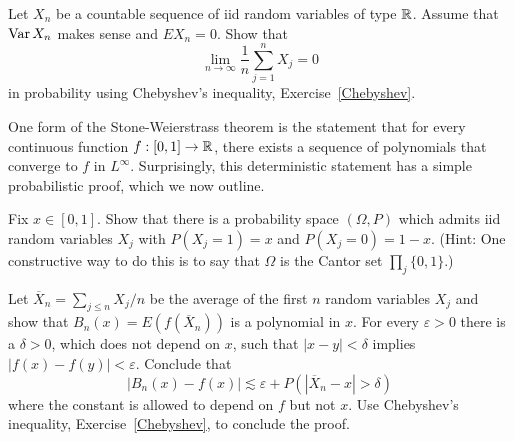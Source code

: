 \begin{exercise}
Let $X_{n}$ be a countable sequence of iid random variables of type $\mathbb{R}$.
Assume that $\operatorname{Var} X_{n}$ makes sense and $EX_{n} = 0$. Show that
\[\lim_{n \to \infty} \frac{1}{n} \sum_{j=1}^{n} X_{j} = 0\]
in probability using Chebyshev's inequality, Exercise~\ref{Chebyshev}.
\end{exercise}

\begin{exercise}
One form of the Stone-Weierstrass theorem is the statement that for every continuous function $f: [0, 1] \to \mathbb{R}$, there exists a sequence of polynomials that converge to $f$ in $L^\infty$.
Surprisingly, this deterministic statement has a simple probabilistic proof, which we now outline.

Fix $x \in [0, 1]$.
Show that there is a probability space $(\Omega, P)$ which admits iid random variables $X_{j}$ with $P(X_{j} = 1) = x$ and $P(X_{j} = 0) = 1 - x$.
(Hint: One constructive way to do this is to say that $\Omega$ is the Cantor set $\prod_{j} \{0, 1\}$.)

Let $\overline X_{n} = \sum_{j \leq n} X_{j}/n$ be the average of the first $n$ random variables $X_{j}$ and show that $B_{n}(x) = E(f(\overline X_{n}))$ is a polynomial in $x$.
For every $\varepsilon > 0$ there is a $\delta > 0$, which does not depend on $x$, such that $|x - y| < \delta$ implies $|f(x) - f(y)| < \varepsilon$.
Conclude that
\[|B_{n}(x) - f(x)| \lesssim \varepsilon + P(|\overline X_{n} - x| > \delta)\]
where the constant is allowed to depend on $f$ but not $x$.
Use Chebyshev's inequality, Exercise~\ref{Chebyshev}, to conclude the proof.
\end{exercise}
